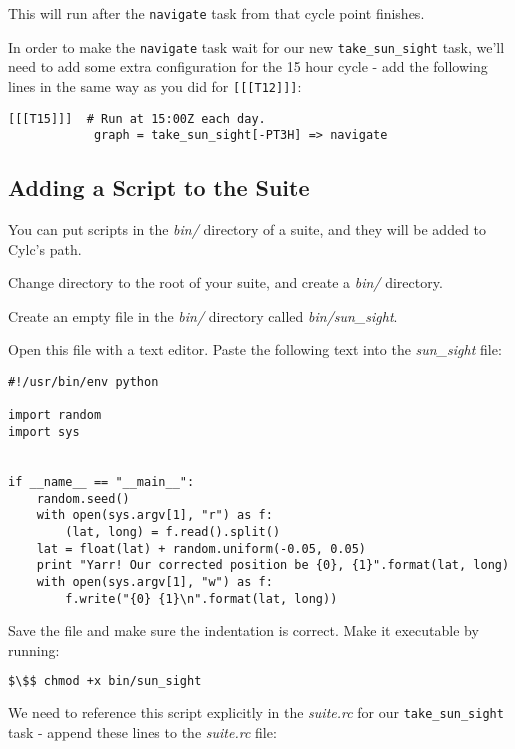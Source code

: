 This will run after the \lstinline{navigate} task from that cycle point finishes.

In order to make the \lstinline{navigate} task wait for our new \lstinline{take_sun_sight} task, we'll need to add some extra configuration for the 15 hour cycle - add the following lines in the same way as you did for \lstinline{[[[T12]]]}:

\lstset{language=suiterc}
\begin{lstlisting}[columns=fullflexible]
        [[[T15]]]  # Run at 15:00Z each day.
            graph = take_sun_sight[-PT3H] => navigate
\end{lstlisting}


\subsection{Adding a Script to the Suite}

You can put scripts in the {\em bin/} directory of a suite, and they will be added to Cylc's path.

Change directory to the root of your suite, and create a {\em bin/} directory.

Create an empty file in the {\em bin/} directory called {\em bin/sun\_sight}.

Open this file with a text editor. Paste the following text into the {\em sun\_sight} file:

\lstset{language=Python}
\begin{lstlisting}[columns=fullflexible]
#!/usr/bin/env python

import random
import sys


if __name__ == "__main__":
    random.seed()
    with open(sys.argv[1], "r") as f:
        (lat, long) = f.read().split()
    lat = float(lat) + random.uniform(-0.05, 0.05)
    print "Yarr! Our corrected position be {0}, {1}".format(lat, long)
    with open(sys.argv[1], "w") as f:
        f.write("{0} {1}\n".format(lat, long))
\end{lstlisting}

Save the file and make sure the indentation is correct. Make it executable by running:

\begin{lstlisting}[mathescape, language=bash]
$\$$ chmod +x bin/sun_sight
\end{lstlisting}

We need to reference this script explicitly in the {\em suite.rc} for our \lstinline{take_sun_sight} task - append these lines to the {\em suite.rc} file:

